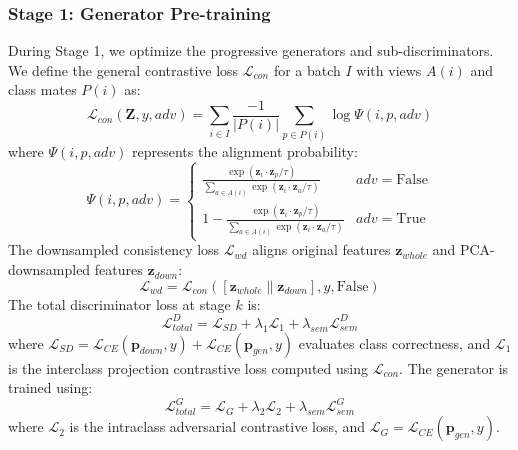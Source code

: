 \subsubsection{Stage 1: Generator Pre-training}
During Stage 1, we optimize the progressive generators and sub-discriminators. We define the general contrastive loss $\mathcal{L}_{con}$ for a batch $I$ with views $A(i)$ and class mates $P(i)$ as:
\begin{equation}
\mathcal{L}_{con}(\mathbf{Z}, y, adv) = \sum_{i \in I} \frac{-1}{|P(i)|} \sum_{p \in P(i)} \log \Psi(i, p, adv)
\end{equation}
where $\Psi(i, p, adv)$ represents the alignment probability:
\begin{equation}
\Psi(i, p, adv) = \begin{cases}
    \frac{\exp(\mathbf{z}_i \cdot \mathbf{z}_p / \tau)}{\sum_{a \in A(i)} \exp(\mathbf{z}_i \cdot \mathbf{z}_a / \tau)} & adv=\text{False} \\
    1 - \frac{\exp(\mathbf{z}_i \cdot \mathbf{z}_p / \tau)}{\sum_{a \in A(i)} \exp(\mathbf{z}_i \cdot \mathbf{z}_a / \tau)} & adv=\text{True}
\end{cases}
\end{equation}
The downsampled consistency loss $\mathcal{L}_{wd}$ aligns original features $\mathbf{z}_{whole}$ and PCA-downsampled features $\mathbf{z}_{down}$:
\begin{equation}
\mathcal{L}_{wd} = \mathcal{L}_{con}([\mathbf{z}_{whole} \parallel \mathbf{z}_{down}], y, \text{False})
\end{equation}
The total discriminator loss at stage $k$ is:
\begin{equation}
\mathcal{L}_{total}^D = \mathcal{L}_{SD} + \lambda_1 \mathcal{L}_{1} + \lambda_{sem} \mathcal{L}_{sem}^D
\end{equation}
where $\mathcal{L}_{SD} = \mathcal{L}_{CE}(\mathbf{p}_{down}, y) + \mathcal{L}_{CE}(\mathbf{p}_{gen}, y)$ evaluates class correctness, and $\mathcal{L}_1$ is the interclass projection contrastive loss computed using $\mathcal{L}_{con}$. The generator is trained using:
\begin{equation}
\mathcal{L}_{total}^G = \mathcal{L}_{G} + \lambda_2 \mathcal{L}_{2} + \lambda_{sem} \mathcal{L}_{sem}^G
\end{equation}
where $\mathcal{L}_2$ is the intraclass adversarial contrastive loss, and $\mathcal{L}_G = \mathcal{L}_{CE}(\mathbf{p}_{gen}, y)$.

